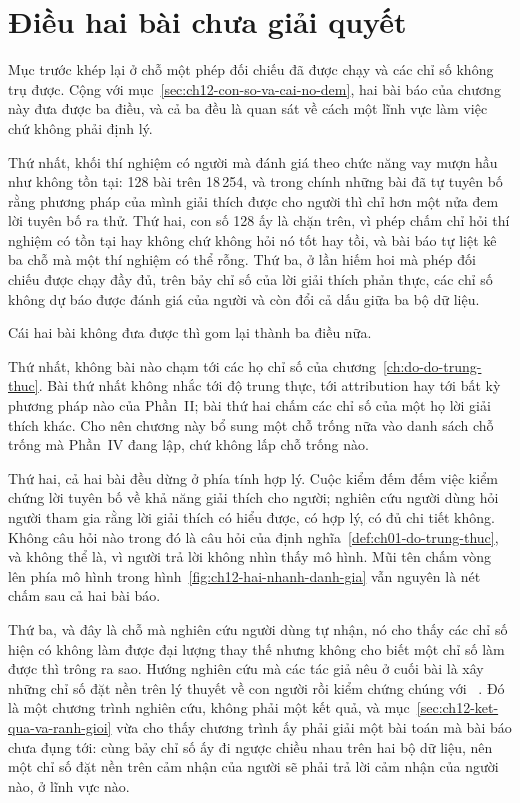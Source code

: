 \section{Điều hai bài chưa giải quyết}
\label{sec:ch12-dieu-chua-giai-quyet}

Mục trước khép lại ở chỗ một phép đối chiếu đã được chạy và các chỉ số không
trụ được. Cộng với mục~\ref{sec:ch12-con-so-va-cai-no-dem}, hai bài báo của
chương này đưa được ba điều, và cả ba đều là quan sát về cách một lĩnh vực
làm việc chứ không phải định lý.

Thứ nhất, khối thí nghiệm có người mà đánh giá theo chức năng vay mượn hầu như
không tồn tại: 128 bài trên 18\,254, và trong chính những bài đã tự tuyên bố
rằng phương pháp của mình giải thích được cho người thì chỉ hơn một nửa đem
lời tuyên bố ra thử. Thứ hai, con số 128 ấy là chặn trên, vì phép chấm chỉ hỏi
thí nghiệm có tồn tại hay không chứ không hỏi nó tốt hay tồi, và bài báo tự
liệt kê ba chỗ mà một thí nghiệm có thể rỗng. Thứ ba, ở lần hiếm hoi mà phép
đối chiếu được chạy đầy đủ, trên bảy chỉ số của lời giải thích phản thực, các
chỉ số không dự báo được đánh giá của người và còn đổi cả dấu giữa ba bộ dữ
liệu.

Cái hai bài không đưa được thì gom lại thành ba điều nữa.

Thứ nhất, không bài nào chạm tới các họ chỉ số của
chương~\ref{ch:do-do-trung-thuc}. Bài thứ nhất không nhắc tới độ trung thực,
tới attribution hay tới bất kỳ phương pháp nào của Phần~II; bài thứ hai chấm
các chỉ số của một họ lời giải thích khác. Cho nên chương này bổ sung một chỗ
trống nữa vào danh sách chỗ trống mà Phần~IV đang lập, chứ không lấp chỗ trống
nào.

Thứ hai, cả hai bài đều dừng ở phía tính hợp lý. Cuộc kiểm đếm đếm việc kiểm
chứng lời tuyên bố về khả năng giải thích cho người; nghiên cứu người dùng hỏi
người tham gia rằng lời giải thích có hiểu được, có hợp lý, có đủ chi tiết
không. Không câu hỏi nào trong đó là câu hỏi của định
nghĩa~\ref{def:ch01-do-trung-thuc}, và không thể là, vì người trả lời không
nhìn thấy mô hình. Mũi tên chấm vòng lên phía mô hình trong
hình~\ref{fig:ch12-hai-nhanh-danh-gia} vẫn nguyên là nét chấm sau cả hai bài
báo.

Thứ ba, và đây là chỗ mà nghiên cứu người dùng tự nhận, nó cho thấy các chỉ số
hiện có không làm được đại lượng thay thế nhưng không cho biết một chỉ số làm
được thì trông ra sao. Hướng nghiên cứu mà các tác giả nêu ở cuối bài là xây
những chỉ số đặt nền trên lý thuyết về con người rồi kiểm chứng chúng với
~\autocite{p25userperception}. Đó là một chương trình
nghiên cứu, không phải một kết quả, và mục~\ref{sec:ch12-ket-qua-va-ranh-gioi}
vừa cho thấy chương trình ấy phải giải một bài toán mà bài báo chưa đụng tới:
cùng bảy chỉ số ấy đi ngược chiều nhau trên hai bộ dữ liệu, nên một chỉ số đặt
nền trên cảm nhận của người sẽ phải trả lời cảm nhận của người nào, ở lĩnh vực
nào.

